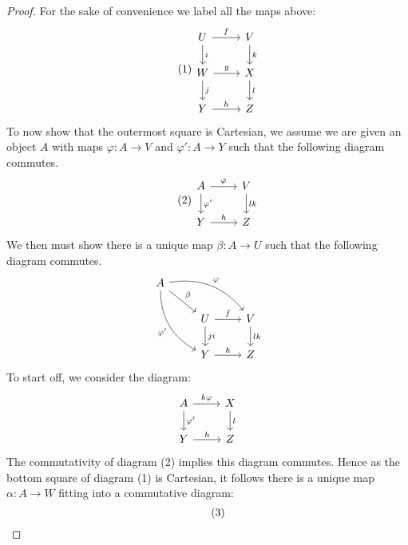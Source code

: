 \documentclass{amsart}
\begin{document}
\begin{proof}
    For the sake of convenience we label all the maps above:
    \begin{equation} \tag{1}
        \begin{tikzcd}
            U \arrow[r, "f"] \arrow[d, "i"] & V \arrow[d, "k"] \\
            W \arrow[r, "g"] \arrow[d, "j"] & X \arrow[d,"l"]\\
            Y \arrow[r, "h"] & Z
        \end{tikzcd}
    \end{equation}
    To now show that the outermost square is Cartesian, we assume we are given an object $A$ with maps $\varphi:A\rightarrow V$ and $\varphi':A\rightarrow Y$ such that the following diagram commutes.
    \begin{equation} \tag{2}
        \begin{tikzcd}
            A \arrow[r, "\varphi"] \arrow[d, "\varphi'"] & V \arrow[d, "lk"] \\
            Y \arrow[r, "h"] & Z
        \end{tikzcd}
    \end{equation}
    We then must show there is a unique map $\beta:A\rightarrow U$ such that the following diagram commutes. 
    \begin{equation*}
        \begin{tikzcd}
            A \arrow[drr, "\varphi", bend left] \arrow[rdd, "\varphi'"', bend right] \arrow[rd, "\beta"] & &  \\
            & U \arrow[r, "f"] \arrow[d, "ji"] & V \arrow[d, "lk"] \\
            & Y \arrow[r, "h"] & Z
        \end{tikzcd}
    \end{equation*}
    To start off, we consider the diagram:
    \begin{equation*}
        \begin{tikzcd}
            A \arrow[r, "k\varphi"] \arrow[d, "\varphi'"] & X \arrow[d, "l"] \\
            Y \arrow[r, "h"] & Z
        \end{tikzcd}
    \end{equation*}
    The commutativity of diagram (2) implies this diagram commutes. Hence as the bottom square of diagram (1) is Cartesian, it follows there is a unique map $\alpha:A\rightarrow W$ fitting into a commutative diagram:
    \begin{equation} \tag{3}
        \begin{tikzcd}

\end{tikzcd}
\end{equation}
\end{proof}
\end{document}
